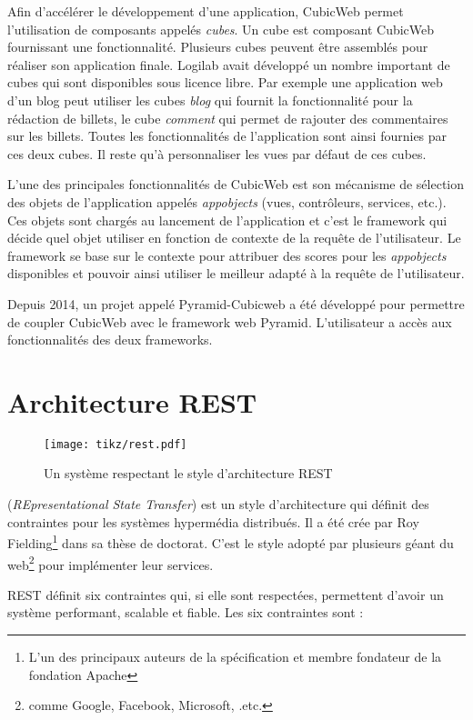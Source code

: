 Afin d'accélérer le développement d'une application, CubicWeb permet l'utilisation de composants appelés \emph{cubes}. Un cube est composant CubicWeb fournissant une fonctionnalité. Plusieurs cubes peuvent être assemblés pour réaliser son application finale. Logilab avait développé un nombre important de cubes qui sont disponibles sous licence libre. Par exemple une application web d'un blog peut utiliser les cubes \textit{blog} qui fournit la fonctionnalité pour la rédaction de billets, le cube \textit{comment} qui permet de rajouter des commentaires sur les billets. Toutes les fonctionnalités de l'application sont ainsi fournies par ces deux cubes. Il reste qu'à personnaliser les vues par défaut de ces cubes.

L'une des principales fonctionnalités de CubicWeb est son mécanisme de sélection des objets de l'application appelés \textit{appobjects} (vues, contrôleurs, services, etc.). Ces objets sont chargés au lancement de l'application et c'est le framework qui décide quel objet utiliser en fonction de contexte de la requête de l'utilisateur. Le framework se base sur le contexte pour attribuer des scores pour les \textit{appobjects} disponibles et pouvoir ainsi utiliser le meilleur adapté à la requête de l'utilisateur.  

Depuis 2014, un projet appelé Pyramid-Cubicweb a été développé pour permettre de coupler CubicWeb avec le framework web Pyramid. L'utilisateur a accès aux fonctionnalités des deux frameworks. 
 
\section{Architecture REST}
\begin{figure}
\centering
  \texttt{[image: tikz/rest.pdf]}
  \caption{Un système respectant le style d'architecture REST}
  \label{fig:rest}
\end{figure}
 (\textit{REpresentational State Transfer}) est un style d'architecture qui définit des contraintes pour les systèmes hypermédia distribués. Il a été crée par Roy Fielding\footnote{L’un des principaux auteurs de la spécification  et membre fondateur de la fondation Apache} dans sa thèse de doctorat\cite{restthesise}. C'est le style adopté par plusieurs géant du web\footnote{comme Google, Facebook, Microsoft, .etc.} pour implémenter leur services. 

REST définit six contraintes qui, si elle sont respectées, permettent d'avoir un système performant, scalable et fiable. Les six contraintes sont :

